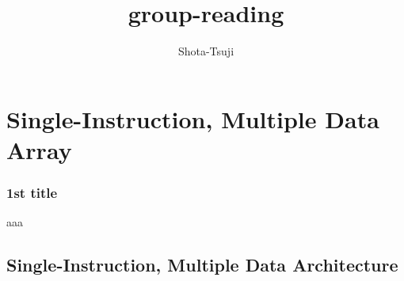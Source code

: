 \documentclass[12pt, unicode]{beamer}
\title{group-reading}
\author{Shota-Tsuji}
\date{}
\institute{Tsukuba University}
\begin{document}
\frame{\maketitle}
\begin{frame}
	\tableofcontents
\end{frame}

\section{Single-Instruction, Multiple Data Array}
\begin{frame}
	\frametitle{1st title}
	aaa
\end{frame}

\subsection{Single-Instruction, Multiple Data Architecture}
\end{document}
